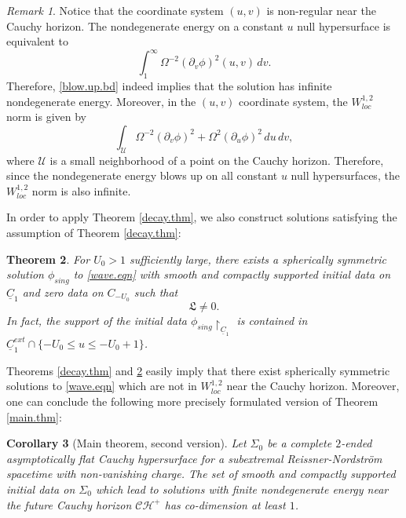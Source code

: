 \documentclass[12 pt, reqno]{amsart}
\newtheorem{theorem}{Theorem}[section]
\newtheorem{corollary}[theorem]{Corollary}
\theoremstyle{definition}
\theoremstyle{remark}
\newtheorem{remark}[theorem]{Remark}
\numberwithin{equation}{section}
\newcommand{\set}[1]{\{#1\}}
\newcommand{\rd}{\partial}
\newcommand{\0}{\emptyset}
\newcommand{\Sgm}{\Sigma}
\newcommand{\Omg}{\Omega}
\newcommand{\calC}{\mathcal C}
\newcommand{\calH}{\mathcal H}
\newcommand{\uC}{\underline{C}}
\newcommand{\CH}{\calC \calH^{+}}		%
\begin{document}
\begin{remark}
Notice that the coordinate system $(u,v)$ is non-regular near the Cauchy horizon. The nondegenerate energy on a constant $u$ null hypersurface is equivalent to
$$\int_1^\infty \Omg^{-2} (\rd_v\phi)^2 (u,v)\, dv.$$
Therefore, \eqref{blow.up.bd} indeed implies that the solution has infinite nondegenerate energy. Moreover, in the $(u,v)$ coordinate system, the $W^{1,2}_{loc}$ norm is given by
$$\int_{\mathcal U} \Omega^{-2}(\rd_v\phi)^2+\Omega^2(\rd_u\phi)^2 \,du\,dv,$$
where $\mathcal U$ is a small neighborhood of a point on the Cauchy horizon. Therefore, since the nondegenerate energy blows up on all constant $u$ null hypersurfaces, the $W^{1,2}_{loc}$ norm is also infinite.
\end{remark}

In order to apply Theorem \ref{decay.thm}, we also construct solutions satisfying the assumption of Theorem \ref{decay.thm}:
\begin{theorem}\label{construction.existence.thm}
For $U_{0} > 1$ sufficiently large, 
there exists a spherically symmetric solution $\phi_{sing}$ to \eqref{wave.eqn} with smooth and compactly supported initial data on $\uC_{1}$ and zero data on $C_{-U_{0}}$ such that 
$$\mathfrak{L}\neq 0.$$
In fact, the support of the initial data $\phi_{sing} \restriction_{\uC_{1}}$ is contained in $\uC_{1}^{ext} \cap \set{-U_{0} \leq u \leq -U_{0}+1}$.
\end{theorem}
Theorems \ref{decay.thm} and \ref{construction.existence.thm} easily imply that there exist spherically symmetric solutions to \eqref{wave.eqn} which are not in $W^{1,2}_{loc}$ near the Cauchy horizon. Moreover, one can conclude the following more precisely formulated version of Theorem \ref{main.thm}:
\begin{corollary}[Main theorem, second version]\label{main.cor}
Let $\Sgm_{0}$ be a complete $2$-ended asymptotically flat Cauchy hypersurface for a subextremal Reissner-Nordstr\"om spacetime with non-vanishing charge.
The set of smooth and compactly supported initial data on $\Sgm_{0}$ which lead to solutions with finite nondegenerate energy near the future Cauchy horizon $\CH$ has co-dimension at least $1$.
\end{corollary}
\end{document}
